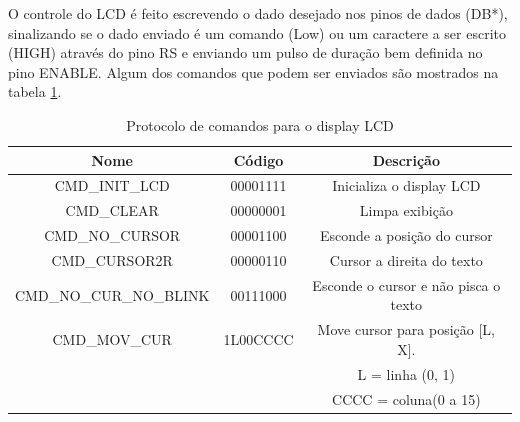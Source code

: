 \documentclass{article}
\begin{document}
O controle do LCD é feito escrevendo o dado desejado nos pinos de dados (DB*), sinalizando se o dado enviado é um comando (Low) ou um caractere a ser escrito (HIGH) através do pino RS e enviando um pulso de duração bem definida no pino ENABLE. Algum dos comandos que podem ser enviados são mostrados na tabela \ref{tab:lcd_commands}.
\begin{table}[H]
	\centering
	\caption{Protocolo de comandos para o display LCD}
	\label{tab:lcd_commands}
	\begin{tabular}{|c|c|c|}
		\hline \bfseries{Nome} & \bfseries{Código} & \bfseries{Descrição} \\
		\hline CMD\_INIT\_LCD & 00001111 & Inicializa o display LCD \\
		\hline CMD\_CLEAR & 00000001 & Limpa exibição\\
		\hline CMD\_NO\_CURSOR & 00001100 & Esconde a posição do cursor\\
		\hline CMD\_CURSOR2R & 00000110 & Cursor a direita do texto\\
		\hline CMD\_NO\_CUR\_NO\_BLINK & 00111000 & Esconde o cursor e não pisca o texto\\
		\hline CMD\_MOV\_CUR & 1L00CCCC & Move cursor para posição [L, X].\\
			& & L = linha (0, 1)\\
			& & CCCC = coluna(0 a 15)\\
		\hline
	\end{tabular}
\end{table}
\end{document}

